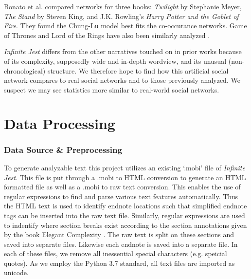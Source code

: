 \documentclass[12pt]{article}
\newcommand{\infinitejest}{{\em Infinite Jest}\xspace}
\begin{document}
Bonato et al. \cite{Bonato2016} compared networks for three books: {\em Twilight} by Stephanie Meyer, {\em The Stand} by Steven King, and J.K. Rowling's {\em Harry Potter and the Goblet of Fire}. 
They found the Chung-Lu model best fits the co-occurance networks.
Game of Thrones and Lord of the Rings have also been similarly analyzed \cite{GOT,ribeiro2016complex}.


\infinitejest differs from the other narratives touched on in prior works because of its complexity, supposedly wide and in-depth wordview, and its unusual (non-chronological) structure. We therefore hope to find how this artificial social network compares to real social networks and to those previously analyzed. We suspect we may see statistics more similar to real-world social networks.

\section*{Data Processing}

\subsubsection*{Data Source \& Preprocessing}
To generate analyzable text this project utilizes an existing `.mobi' file of \infinitejest. This file is put through a .mobi to HTML conversion to generate an HTML formatted file as well as a .mobi to raw text conversion. This enables the use of regular expressions to find and parse various text features automatically. Thus the HTML text is used to identify endnote locations such that simplified endnote tags can be inserted into the raw text file. Similarly, regular expressions are used to indentify where section breaks exist according to the section annotations given by the book Elegant Complexity \cite{carlisle_2007}. The raw text is split on these sections and saved into separate files. Likewise each endnote is saved into a separate file. In each of these files, we remove all inessential special characters (e.g. speicial quotes). As we employ the Python 3.7 standard, all text files are imported as unicode.
\end{document}
